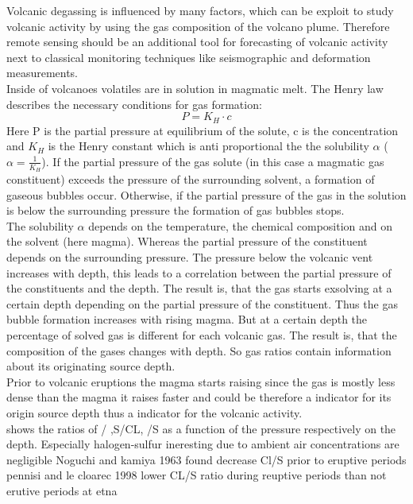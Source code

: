 \documentclass  [
  paper    = a4,
  BCOR     = 10mm,
  twoside,
  fontsize = 12pt,
  fleqn,
  toc      = bibnumbered,
  toc      = listofnumbered,
  numbers  = noendperiod,
  headings = normal,
  listof   = leveldown,
  version  = 3.03
]                                       {scrreprt}
\begin{document}
	Volcanic degassing is influenced by many factors, which can be exploit to study volcanic activity by using the gas composition of the volcano plume. Therefore remote sensing should be an additional tool for forecasting of volcanic activity next to classical monitoring techniques like seismographic and deformation measurements.\\
	Inside of volcanoes volatiles are in solution in magmatic melt. The Henry law  describes the necessary conditions for gas formation:
	\begin{equation}
	P = K_{H}\cdot c
	\label{Henrylaw}
	\end{equation}
	Here P is the partial pressure at equilibrium of the solute, c is the concentration and $ K_{H}$ is the Henry constant which is anti proportional the the solubility $\alpha$ ($\alpha = \frac{1}{ K_{H}}$).
	If the partial pressure of the gas solute (in this case a magmatic gas constituent) exceeds the pressure of the surrounding solvent, a formation of gaseous bubbles occur. Otherwise, if the partial pressure of the gas in the solution is below the surrounding pressure the formation of gas bubbles stops.\\
	The solubility $\alpha$ depends on the temperature, the chemical composition and on the solvent (here magma). Whereas the partial pressure of the constituent depends on the surrounding pressure. The pressure below the volcanic vent increases with depth, this leads to a correlation between the partial pressure of the constituents and the depth.
	The result is, that the gas starts exsolving at a certain depth depending on the  partial pressure of the constituent. Thus the gas bubble formation increases with rising magma. But at a certain depth the percentage of solved gas is different for each volcanic gas. The result is, that the composition of the gases changes with depth. So gas ratios contain information about its originating source depth.\\
	Prior to volcanic eruptions the magma starts raising since the gas is mostly less dense than the magma it raises faster and could be therefore a indicator for its origin source depth thus a indicator for the volcanic activity.\\
	 shows the ratios of   / ,S/CL, /S as a function of the pressure respectively on the depth. 
	Especially halogen-sulfur ineresting due to ambient air concentrations are negligible
	Noguchi and kamiya 1963 found decrease Cl/S prior to eruptive periods
	pennisi and le cloarec 1998 lower CL/S ratio during reuptive periods than not erutive periods at etna
\end{document}
